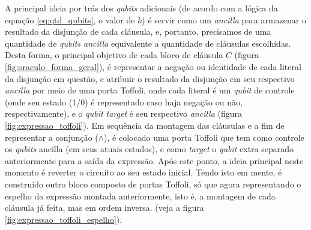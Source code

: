 \documentclass[12pt]{article}
\begin{document}
A principal ideia por trás dos \textit{qubits} adicionais (de acordo com a lógica da equação \ref{eq:qtd_qubits}, o valor de $k$) é servir como um \textit{ancilla} para armazenar o resultado da disjunção de cada cláusula, e, portanto, precisamos de uma quantidade de \textit{qubits ancilla} equivalente a quantidade de cláusulas escolhidas. Desta forma, o principal objetivo de cada bloco de cláusula $C$ (figura \ref{fig:oraculo_forma_geral}), é representar a negação ou identidade de cada literal da disjunção em questão, e atribuir o resultado da disjunção em seu respectivo \textit{ancilla} por meio de uma porta Toffoli, onde cada literal é um \textit{qubit} de controle (onde seu estado (1/0) é representado caso haja negação ou não, respectivamente), e o \textit{qubit target} é seu respectivo \textit{ancilla}  (figura \ref{fig:expressao_toffoli}). Em sequência da montagem das cláusulas e a fim de representar a conjunção ($\land$), é colocado uma porta Toffoli que tem como controle os \textit{qubits} ancilla (em seus atuais estados), e como \textit{target} o \textit{qubit} extra separado anteriormente para a saída da expressão. 
Após este ponto, a ideia principal neste momento é reverter o circuito ao seu estado inicial. Tendo isto em mente, é construído outro bloco composto de portas Toffoli, só que agora representando o espelho da expressão montada anteriormente, isto é, a montagem de cada cláusula já feita, mas em ordem inversa. (veja a figura \ref{fig:expressao_toffoli_espelho}).
\end{document}
